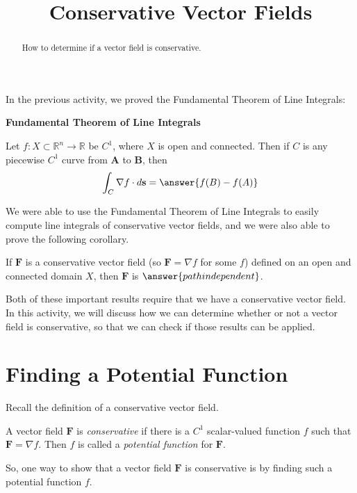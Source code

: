 \documentclass{ximera}
\title{Conservative Vector Fields}
\begin{document}
  
\begin{abstract}  
How to determine if a vector field is conservative.
\end{abstract}  
\maketitle  

In the previous activity, we proved the Fundamental Theorem of Line Integrals:

\begin{theorem}
\textbf{Fundamental Theorem of Line Integrals}

Let $f:X\subset \mathbb{R}^n\rightarrow \mathbb{R}$ be $C^1$, where $X$ is open and connected. Then if $C$ is any piecewise $C^1$ curve from $\textbf{A}$ to $\textbf{B}$, then
\[
\int_C\nabla f\cdot d\textbf{s} = \answer{f(B)-f(A)}
\]
\end{theorem}

We were able to use the Fundamental Theorem of Line Integrals to easily compute line integrals of conservative vector fields, and we were also able to prove the following corollary.

\begin{corollary}
If $\textbf{F}$ is a conservative vector field (so $\textbf{F}=\nabla f$ for some $f$) defined on an open and connected domain $X$, then $\textbf{F}$ is $\answer{path independent}$.
\end{corollary}

Both of these important results require that we have a conservative vector field. In this activity, we will discuss how we can determine whether or not a vector field is conservative, so that we can check if those results can be applied.

\section{Finding a Potential Function}

Recall the definition of a conservative vector field.

\begin{definition}
A vector field $\mathbf{F}$ is \emph{conservative} if there is a $C^1$ scalar-valued function $f$ such that $\mathbf{F}=\nabla f$. Then $f$ is called a \emph{potential function} for $\mathbf{F}$.
\end{definition}

So, one way to show that a vector field $\mathbf{F}$ is conservative is by finding such a potential function $f$.
\end{document}
